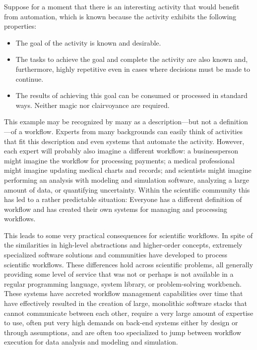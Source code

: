 
Suppose for a moment that there is an interesting activity that would benefit
from automation, which is known because the activity exhibits the following
properties: 
\begin{itemize} 
\item The goal of the activity is known and desirable.  
\item The tasks to achieve the goal and complete the activity are also known 
and, furthermore, highly repetitive even in cases where decisions must be 
made to continue.  
\item The results of achieving this goal can be consumed or processed in 
standard ways. Neither magic nor clairvoyance are required.
\end{itemize}

This example may be recognized by many as a description---but not a
definition---of a workflow. Experts from many backgrounds can easily think of
activities that fit this description and even systems that automate the
activity. However, each expert will probably also imagine a different workflow:
a businessperson might imagine the workflow for processing payments; a medical
professional might imagine updating medical charts and records; and
scientists might imagine performing an analysis with modeling and simulation
software, analyzing a large amount of data, or quantifying uncertainty.
Within the scientific community this has led to a rather predictable situation:
Everyone has a different definition of workflow and has created their own
systems for managing and processing workflows.

This leads to some very practical consequences for scientific
workflows. In spite of the similarities in high-level abstractions and
higher-order concepts, extremely specialized software solutions and communities
have developed to process scientific workflows. These differences hold across
scientific problems, all generally providing some level of service that was not
or perhaps is not available in a regular programming language, system library,
or problem-solving workbench. These systems have accreted workflow management
capabilities over time that have effectively resulted in the creation of large,
monolithic software stacks that cannot communicate between each other, require a
very large amount of expertise to use, often put very high demands on back-end
systems either by design or through assumptions, and are often too specialized
to jump between workflow execution for data analysis and modeling and
simulation. 

